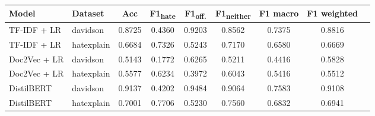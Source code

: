 \begin{tabular}{llccccccc}
\toprule
Model & Dataset & Acc & F1\textsubscript{hate} & F1\textsubscript{off.} & F1\textsubscript{neither} & F1 macro & F1 weighted \\
\midrule
TF-IDF + LR & davidson & 0.8725 & 0.4360 & 0.9203 & 0.8562 & 0.7375 & 0.8816 \\
TF-IDF + LR & hatexplain & 0.6684 & 0.7326 & 0.5243 & 0.7170 & 0.6580 & 0.6669 \\
Doc2Vec + LR & davidson & 0.5143 & 0.1772 & 0.6265 & 0.5211 & 0.4416 & 0.5828 \\
Doc2Vec + LR & hatexplain & 0.5577 & 0.6234 & 0.3972 & 0.6043 & 0.5416 & 0.5512 \\
DistilBERT & davidson & 0.9137 & 0.4202 & 0.9484 & 0.9064 & 0.7583 & 0.9108 \\
DistilBERT & hatexplain & 0.7001 & 0.7706 & 0.5230 & 0.7560 & 0.6832 & 0.6941 \\
\bottomrule
\end{tabular}
